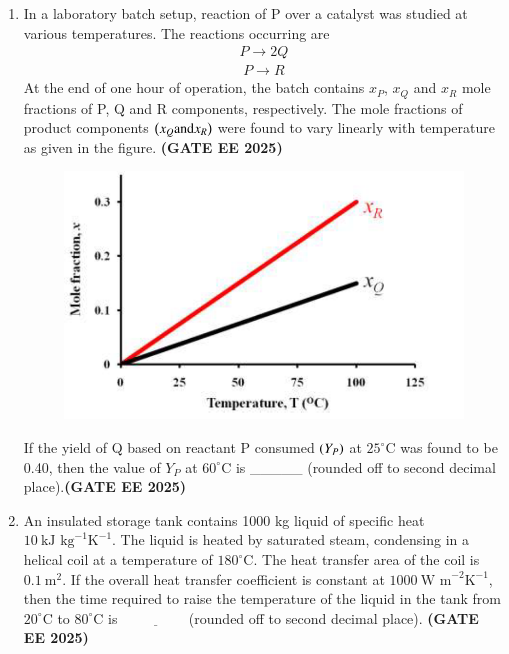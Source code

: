 \documentclass[journal,12pt,onecolumn]{IEEEtran}
\theoremstyle{remark}
\begin{document}
\begin{enumerate}
\item In a laboratory batch setup, reaction of P over a catalyst was studied at various temperatures. The reactions occurring are
	\begin{align} P\rightarrow2Q \end{align}
		\begin{align} P\rightarrow R \end{align}
At the end of one hour of operation, the batch contains $x_{P}$, $x_{Q}$ and $x_{R}$ mole fractions of P, Q and R components, respectively. The mole fractions of product components $\brak{x_{Q} \text{and} x_{R}}$ were found to vary linearly with temperature as given in the figure. \hfill \textbf{(GATE EE 2025)}

\begin{figure}
	\begin{center}
  
 \includegraphics[width=0.7\columnwidth]{figs/33.png}
	\caption{}
	\label{fig33}
\end{center}
\end{figure}
If the yield of Q based on reactant P consumed $\brak{Y_{P}}$ at $25^{\circ}\text{C}$ was found to be 0.40, then the value of $Y_{P}$ at $60^{\circ}\text{C}$ is \_\_\_\_\_ (rounded off to second decimal place).\hfill \textbf{(GATE EE 2025)}

\item An insulated storage tank contains 1000 kg liquid of specific heat $10~\text{kJ kg}^{-1}\text{K}^{-1}$. The liquid is heated by saturated steam, condensing in a helical coil at a temperature of $180^{\circ}\text{C}$. The heat transfer area of the coil is $0.1~\text{m}^{2}$. If the overall heat transfer coefficient is constant at $1000~\text{W m}^{-2}\text{K}^{-1}$, then the time  required to raise the temperature of the liquid in the tank from $20^{\circ}\text{C}$ to $80^{\circ}\text{C}$ is $\underline{\hspace{2cm}}$(rounded off to second decimal place). \hfill \textbf{(GATE EE 2025)}




\end{enumerate}
\end{document}
